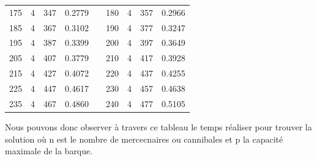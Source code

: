 \documentclass[a4paper, 12pt, french, oneside]{book}
\begin{document}
\begin{table}[!ht]
\begin{tabularx}{\linewidth}{|c|c|c|c|X|c|c|c|c|}
        175          & 4            & 347             & 0.2779                        &  &

        180          & 4            & 357             & 0.2966                                                                                                           \\

        185          & 4            & 367             & 0.3102                        &  &

        190          & 4            & 377             & 0.3247                                                                                                           \\

        195          & 4            & 387             & 0.3399                        &  &

        200          & 4            & 397             & 0.3649                                                                                                           \\

        205          & 4            & 407             & 0.3779                        &  &

        210          & 4            & 417             & 0.3928                                                                                                           \\

        215          & 4            & 427             & 0.4072                        &  &

        220          & 4            & 437             & 0.4255                                                                                                           \\

        225          & 4            & 447             & 0.4617                        &  &

        230          & 4            & 457             & 0.4638                                                                                                           \\

        235          & 4            & 467             & 0.4860                        &  &

        240          & 4            & 477             & 0.5105                                                                                                           \\
        \cline{1-4}\cline{6-9}
    \end{tabularx}
\end{table}
Nous pouvons donc observer à travers ce tableau le temps réaliser pour trouver la solution où n est le nombre de mercecnaires ou cannibales et p la capacité maximale de la barque.
\end{document}
